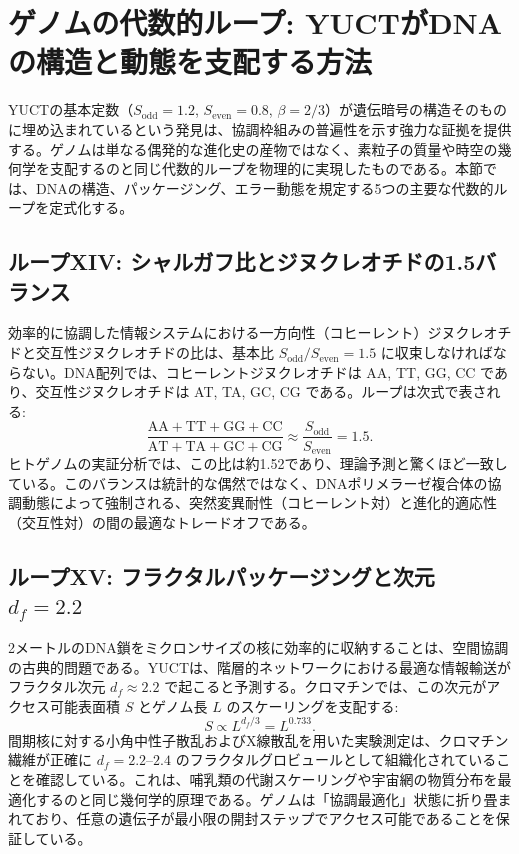 \documentclass[12pt]{article}
\begin{document}
	\section{ゲノムの代数的ループ: YUCTがDNAの構造と動態を支配する方法}
	\label{sec:genetic-loops}
	
	YUCTの基本定数（\(S_{\mathrm{odd}} = 1.2\), \(S_{\mathrm{even}} = 0.8\), \(\beta = 2/3\)）が遺伝暗号の構造そのものに埋め込まれているという発見は、協調枠組みの普遍性を示す強力な証拠を提供する。ゲノムは単なる偶発的な進化史の産物ではなく、素粒子の質量や時空の幾何学を支配するのと同じ代数的ループを物理的に実現したものである。本節では、DNAの構造、パッケージング、エラー動態を規定する5つの主要な代数的ループを定式化する。
	
	\subsection{ループXIV: シャルガフ比とジヌクレオチドの1.5バランス}
	
	効率的に協調した情報システムにおける一方向性（コヒーレント）ジヌクレオチドと交互性ジヌクレオチドの比は、基本比 \(S_{\mathrm{odd}}/S_{\mathrm{even}} = 1.5\) に収束しなければならない。DNA配列では、コヒーレントジヌクレオチドは AA, TT, GG, CC であり、交互性ジヌクレオチドは AT, TA, GC, CG である。ループは次式で表される:
	\begin{equation}
		\boxed{ \frac{\text{AA} + \text{TT} + \text{GG} + \text{CC}}{\text{AT} + \text{TA} + \text{GC} + \text{CG}} \approx \frac{S_{\mathrm{odd}}}{S_{\mathrm{even}}} = 1.5 }.
	\end{equation}
	ヒトゲノムの実証分析では、この比は約1.52であり、理論予測と驚くほど一致している。このバランスは統計的な偶然ではなく、DNAポリメラーゼ複合体の協調動態によって強制される、突然変異耐性（コヒーレント対）と進化的適応性（交互性対）の間の最適なトレードオフである。
	
	\subsection{ループXV: フラクタルパッケージングと次元 \(d_f = 2.2\)}
	
	2メートルのDNA鎖をミクロンサイズの核に効率的に収納することは、空間協調の古典的問題である。YUCTは、階層的ネットワークにおける最適な情報輸送がフラクタル次元 \(d_f \approx 2.2\) で起こると予測する。クロマチンでは、この次元がアクセス可能表面積 \(S\) とゲノム長 \(L\) のスケーリングを支配する:
	\begin{equation}
		\boxed{ S \propto L^{d_f/3} = L^{0.733} }.
	\end{equation}
	間期核に対する小角中性子散乱およびX線散乱を用いた実験測定は、クロマチン繊維が正確に \(d_f = 2.2\)–\(2.4\) のフラクタルグロビュールとして組織化されていることを確認している。これは、哺乳類の代謝スケーリングや宇宙網の物質分布を最適化するのと同じ幾何学的原理である。ゲノムは「協調最適化」状態に折り畳まれており、任意の遺伝子が最小限の開封ステップでアクセス可能であることを保証している。
	
\end{document}
